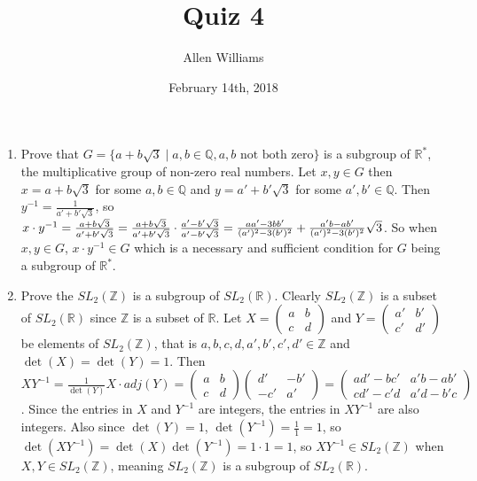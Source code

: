 \documentclass{article}
\title{Quiz 4}
\author{Allen Williams }
\date{February 14th, 2018}
\begin{document}
\maketitle

\begin{enumerate}
\item Prove that $G=\{a+b\sqrt{3}\mid a,b\in\mathbb{Q}, a,b\text{ not both zero}\}$ is a subgroup of $\mathbb{R}^*$, the multiplicative group of non-zero real numbers.  Let $x,y\in G$ then $x=a+b\sqrt{3}$ for some $a,b\in\mathbb{Q}$ and $y=a'+b'\sqrt{3}$ for some $a',b'\in\mathbb{Q}$.  Then $y^{-1}=\frac{1}{a'+b'\sqrt{3}}$, so $x\cdot y^{-1}=\frac{a+b\sqrt{3}}{a'+b'\sqrt{3}}=\frac{a+b\sqrt{3}}{a'+b'\sqrt{3}}\cdot \frac{a'-b'\sqrt{3}}{a'-b'\sqrt{3}}\newline=\frac{aa'-3bb'}{(a')^2-3(b')^2}+\frac{a'b-ab'}{(a')^2-3(b')^2}\sqrt{3}$.  So when $x,y\in G$, $x\cdot y^{-1}\in G$ which is a necessary and sufficient condition for $G$ being a subgroup of $\mathbb{R}^*$.

\item Prove the $SL_2(\mathbb{Z})$ is a subgroup of $SL_2(\mathbb{R})$.  Clearly $SL_2(\mathbb{Z})$ is a subset of $SL_2(\mathbb{R})$ since $\mathbb{Z}$ is a subset of $\mathbb{R}$.  Let $X=\left( \begin{array}{cc} a & b\\ c & d \end{array} \right)$ and $Y=\left( \begin{array}{cc} a' & b'\\ c' & d' \end{array} \right)$ be elements of $SL_2(\mathbb{Z})$, that is $a,b,c,d,a',b',c',d'\in \mathbb{Z}$ and $\det(X)=\det(Y)=1$.  Then $XY^{-1}=\frac{1}{\det(Y)}X\cdot adj(Y)=\left( \begin{array}{cc} a & b\\ c & d \end{array}\right)\left( \begin{array}{cc} d' & -b'\\ -c' & a' \end{array}\right)=\left( \begin{array}{cc} ad'-bc' & a'b-ab' \\ cd'-c'd & a'd-b'c \end{array}\right)$.  Since the entries in $X$ and $Y^{-1}$ are integers, the entries in $XY^{-1}$ are also integers.  Also since $\det(Y)=1$, $\det(Y^{-1})=\frac{1}{1}=1$, so $\det(XY^{-1})=\det(X)\det(Y^{-1})=1\cdot1=1$, so $XY^{-1}\in SL_2(\mathbb{Z})$ when $X,Y\in SL_2(\mathbb{Z})$, meaning $SL_2(\mathbb{Z})$ is a subgroup of $SL_2(\mathbb{R})$.


\end{enumerate}
\end{document}
